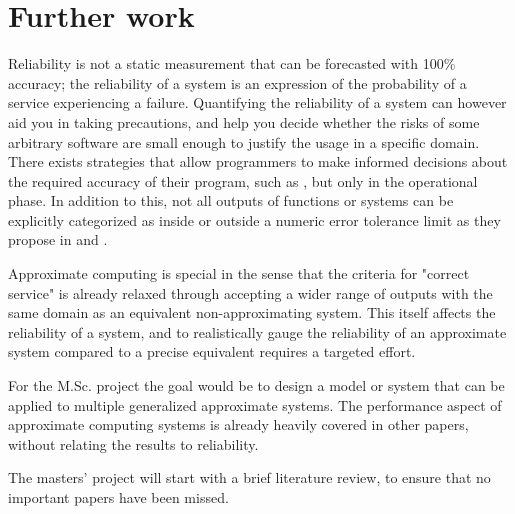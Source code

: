 \section{Further work}


Reliability is not a static measurement that can be forecasted with 100\% accuracy; the reliability of a system is an expression of the probability of a service experiencing a failure. Quantifying the reliability of a system can however aid you in taking precautions, and help you decide whether the risks of some arbitrary software are small enough to justify the usage in a specific domain. There exists strategies that allow programmers to make informed decisions about the required accuracy of their program, such as \citet{wunderlich2016pushing}, but only in the operational phase. In addition to this, not all outputs of functions or systems can be explicitly categorized as inside or outside a numeric error tolerance limit as they propose in \citet{wunderlich2016pushing} and \citet{li2021understanding}.

Approximate computing is special in the sense that the criteria for "correct service" is already relaxed through accepting a wider range of outputs with the same domain as an equivalent non-approximating system. This itself affects the reliability of a system, and to realistically gauge the reliability of an approximate system compared to a precise equivalent requires a targeted effort.

For the M.Sc. project the goal would be to design a model or system that can be applied to multiple generalized approximate systems. The performance aspect of approximate computing systems is already heavily covered in other papers, without relating the results to reliability. 

The masters' project will start with a brief literature review, to ensure that no important papers have been missed. 

